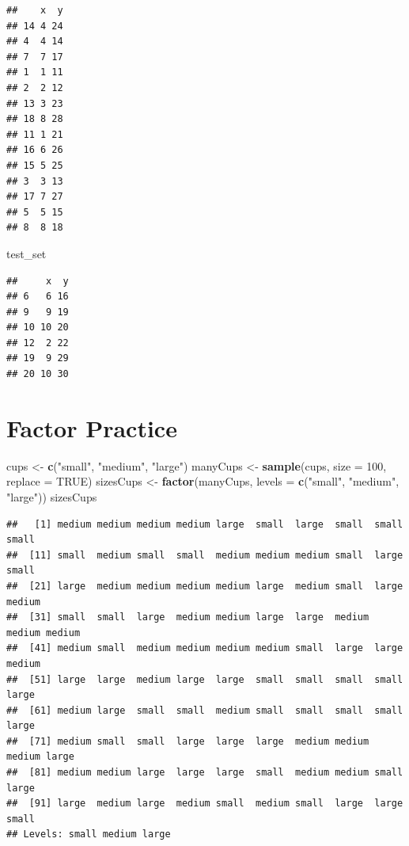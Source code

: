 \documentclass[]{book}
\newenvironment{Shaded}{\begin{snugshade}}{\end{snugshade}}
\newcommand{\DataTypeTok}[1]{\textcolor[rgb]{0.13,0.29,0.53}{#1}}
\newcommand{\DecValTok}[1]{\textcolor[rgb]{0.00,0.00,0.81}{#1}}
\newcommand{\KeywordTok}[1]{\textcolor[rgb]{0.13,0.29,0.53}{\textbf{#1}}}
\newcommand{\NormalTok}[1]{#1}
\newcommand{\OtherTok}[1]{\textcolor[rgb]{0.56,0.35,0.01}{#1}}
\newcommand{\StringTok}[1]{\textcolor[rgb]{0.31,0.60,0.02}{#1}}
\begin{document}
\begin{verbatim}
##    x  y
## 14 4 24
## 4  4 14
## 7  7 17
## 1  1 11
## 2  2 12
## 13 3 23
## 18 8 28
## 11 1 21
## 16 6 26
## 15 5 25
## 3  3 13
## 17 7 27
## 5  5 15
## 8  8 18
\end{verbatim}

\begin{Shaded}
\begin{Highlighting}[]
\NormalTok{test_set}
\end{Highlighting}
\end{Shaded}

\begin{verbatim}
##     x  y
## 6   6 16
## 9   9 19
## 10 10 20
## 12  2 22
## 19  9 29
## 20 10 30
\end{verbatim}

\hypertarget{factorpractice}{%
\chapter{Factor Practice}\label{factorpractice}}

\begin{Shaded}
\begin{Highlighting}[]
\NormalTok{cups <-}\StringTok{ }\KeywordTok{c}\NormalTok{(}\StringTok{"small"}\NormalTok{, }\StringTok{"medium"}\NormalTok{, }\StringTok{"large"}\NormalTok{)}
\NormalTok{manyCups <-}\StringTok{ }\KeywordTok{sample}\NormalTok{(cups, }\DataTypeTok{size =} \DecValTok{100}\NormalTok{, }\DataTypeTok{replace =} \OtherTok{TRUE}\NormalTok{)}
\NormalTok{sizesCups <-}\StringTok{ }\KeywordTok{factor}\NormalTok{(manyCups, }\DataTypeTok{levels =} \KeywordTok{c}\NormalTok{(}\StringTok{"small"}\NormalTok{, }\StringTok{"medium"}\NormalTok{, }\StringTok{"large"}\NormalTok{))}
\NormalTok{sizesCups}
\end{Highlighting}
\end{Shaded}

\begin{verbatim}
##   [1] medium medium medium medium large  small  large  small  small  small 
##  [11] small  medium small  small  medium medium medium small  large  small 
##  [21] large  medium medium medium medium large  medium small  large  medium
##  [31] small  small  large  medium medium large  large  medium medium medium
##  [41] medium small  medium medium medium medium small  large  large  medium
##  [51] large  large  medium large  large  small  small  small  small  large 
##  [61] medium large  small  small  medium small  small  small  small  large 
##  [71] medium small  small  large  large  large  medium medium medium large 
##  [81] medium medium large  large  large  small  medium medium small  large 
##  [91] large  medium large  medium small  medium small  large  large  small 
## Levels: small medium large
\end{verbatim}
\end{document}
